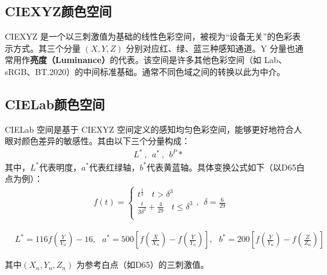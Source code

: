 \subsection[\hspace{-2pt}CIEXYZ颜色空间]{{\heiti{} \hspace{-8pt}CIEXYZ颜色空间}}\label{section2: CIEXYZ颜色空间}
CIEXYZ 是一个以三刺激值为基础的线性色彩空间，被视为“设备无关”的色彩表示方式。其三个分量 $(X,Y,Z)$ 分别对应红、绿、蓝三种感知通道。Y 分量也通常用作\textbf{亮度（Luminance）}的代表。该空间是许多其他色彩空间（如 Lab、sRGB、BT.2020）的中间标准基础。通常不同色域之间的转换以此为中介。

\subsection[\hspace{-2pt}CIELab颜色空间]{{\heiti{} \hspace{-8pt}CIELab颜色空间}}\label{section2: CIELab颜色空间}
CIELab 空间是基于 CIEXYZ 空间定义的感知均匀色彩空间，能够更好地符合人眼对颜色差异的敏感性。其由以下三个分量构成：
\begin{equation}
\begin{aligned}
  &L^{*}\ ,\ \ a^{*}\ ,\ \ b^P{*}\ 
\end{aligned}
\end{equation}
其中，$L^{*}$代表明度，$a^{*}$代表红绿轴，$b^{*}$代表黄蓝轴。具体变换公式如下（以D65白点为例）：
\begin{equation}
\begin{aligned}
  &f(t) = 
\begin{cases}
  t^{\frac{1}{3}}\ \ \ \ t>\delta^{3}\\
  \frac{t}{3\delta^{2}}+\frac{4}{29}\ \ \ \ t\leq \delta^{3}\\
\end{cases}
,\ \ \delta=\frac{6}{29}
\end{aligned}
\end{equation}

\begin{equation}
\begin{aligned}
  &L^{*} = 116f(\frac{Y}{Y_{n}})-16,\ \ \ a^{*}=500[f(\frac{X}{X_{n}})-f(\frac{Y}{Y_{n}})],\ \ \ b^{*} = 200[f(\frac{Y}{Y_{n}})-f(\frac{Z}{Z_{n}})]
\end{aligned}
\end{equation}

其中$(X_{n},Y_{n},Z_{n})$ 为参考白点（如D65）的三刺激值。

